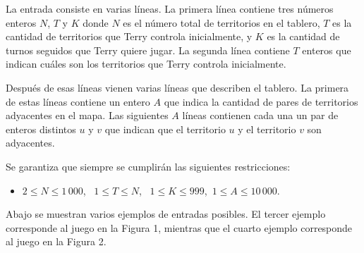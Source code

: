 \documentclass{oci}
\begin{document}
\begin{inputDescription}
  La entrada consiste en varias líneas.
%
  La primera línea contiene tres números enteros $N$, $T$ y $K$ donde
  $N$ es el número total de territorios en el tablero,
	$T$ es la cantidad de territorios que Terry controla inicialmente, y
	$K$ es la cantidad de turnos seguidos que Terry quiere jugar.
	La segunda línea contiene $T$ enteros que indican cuáles son los territorios
  que Terry controla inicialmente.
	
	Después de esas líneas vienen varias líneas que describen el tablero.
	La primera de estas líneas contiene un entero $A$ que indica la cantidad de 
	pares de territorios adyacentes en el mapa.
	Las siguientes $A$ líneas contienen cada una un par de enteros distintos $u$ y $v$
	que indican que el territorio $u$ y el territorio $v$ son adyacentes.
	
  Se garantiza que siempre se cumplirán las siguientes restricciones:
	\begin{itemize}
	\item $2 \le N \le 1\,000$, \ $1 \le T\le N$, \ $1 \le K\le 999$,\  $1 \le A \le 10\,000$.
	\end{itemize}

  Abajo se muestran varios ejemplos de entradas posibles. El tercer ejemplo corresponde al
  juego en la Figura 1, mientras que el cuarto ejemplo corresponde al juego en la Figura 2.



%
%
%
%
%
\end{inputDescription}
\end{document}
